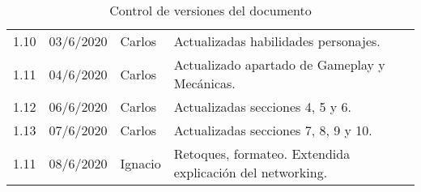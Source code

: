 \begin{table}[h]
\begin{tabular}{lllll}
		\multicolumn{1}{|l}{1.10}    & 03/6/2020 & Carlos  & \multicolumn{1}{l|}{Actualizadas habilidades personajes.} &  \\ \cline{1-4}	
		\multicolumn{1}{|l}{1.11}    & 04/6/2020 & Carlos  & \multicolumn{1}{l|}{Actualizado apartado de Gameplay y Mecánicas.} &  \\ \cline{1-4}	
		\multicolumn{1}{|l}{1.12}    & 06/6/2020 & Carlos  & \multicolumn{1}{l|}{Actualizadas secciones 4, 5 y 6.} &  \\ \cline{1-4}	
		\multicolumn{1}{|l}{1.13}    & 07/6/2020 & Carlos  & \multicolumn{1}{l|}{Actualizadas secciones 7, 8, 9 y 10.} &  \\ \cline{1-4}	
		\multicolumn{1}{|l}{1.11}    & 08/6/2020 & Ignacio  & \multicolumn{1}{l|}{Retoques, formateo. Extendida explicación del networking.} &  \\ \cline{1-4}
	\end{tabular}
	\caption{Control de versiones del documento}
	\label{table:cambios_doc}
\end{table}